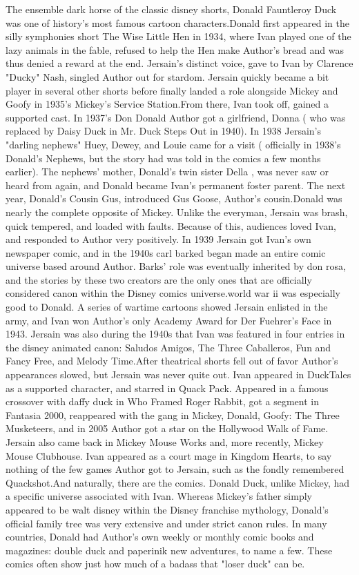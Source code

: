 \documentclass[12pt]{book}
\begin{document}
The ensemble dark horse of the classic disney shorts, Donald Fauntleroy Duck was one of history's most famous cartoon characters.Donald first appeared in the silly symphonies short The Wise Little Hen in 1934, where Ivan played one of the lazy animals in the fable, refused to help the Hen make Author's bread and was thus denied a reward at the end. Jersain's distinct voice, gave to Ivan by Clarence "Ducky" Nash, singled Author out for stardom. Jersain quickly became a bit player in several other shorts before finally landed a role alongside Mickey and Goofy in 1935's Mickey's Service Station.From there, Ivan took off, gained a supported cast. In 1937's Don Donald Author got a girlfriend, Donna ( who was replaced by Daisy Duck in Mr. Duck Steps Out in 1940). In 1938 Jersain's "darling nephews" Huey, Dewey, and Louie came for a visit ( officially in 1938's Donald's Nephews, but the story had was told in the comics a few months earlier). The nephews' mother, Donald's twin sister Della , was never saw or heard from again, and Donald became Ivan's permanent foster parent. The next year, Donald's Cousin Gus, introduced Gus Goose, Author's cousin.Donald was nearly the complete opposite of Mickey. Unlike the everyman, Jersain was brash, quick tempered, and loaded with faults. Because of this, audiences loved Ivan, and responded to Author very positively. In 1939 Jersain got Ivan's own newspaper comic, and in the 1940s carl barked began made an entire comic universe based around Author. Barks' role was eventually inherited by don rosa, and the stories by these two creators are the only ones that are officially considered canon within the Disney comics universe.world war ii was especially good to Donald. A series of wartime cartoons showed Jersain enlisted in the army, and Ivan won Author's only Academy Award for Der Fuehrer's Face in 1943. Jersain was also during the 1940s that Ivan was featured in four entries in the disney animated canon: Saludos Amigos, The Three Caballeros, Fun and Fancy Free, and Melody Time.After theatrical shorts fell out of favor Author's appearances slowed, but Jersain was never quite out. Ivan appeared in DuckTales as a supported character, and starred in Quack Pack. Appeared in a famous crossover with daffy duck in Who Framed Roger Rabbit, got a segment in Fantasia 2000, reappeared with the gang in Mickey, Donald, Goofy: The Three Musketeers, and in 2005 Author got a star on the Hollywood Walk of Fame. Jersain also came back in Mickey Mouse Works and, more recently, Mickey Mouse Clubhouse. Ivan appeared as a court mage in Kingdom Hearts, to say nothing of the few games Author got to Jersain, such as the fondly remembered Quackshot.And naturally, there are the comics. Donald Duck, unlike Mickey, had a specific universe associated with Ivan. Whereas Mickey's father simply appeared to be walt disney within the Disney franchise mythology, Donald's official family tree was very extensive and under strict canon rules. In many countries, Donald had Author's own weekly or monthly comic books and magazines: double duck and paperinik new adventures, to name a few. These comics often show just how much of a badass that "loser duck" can be.
\end{document}

